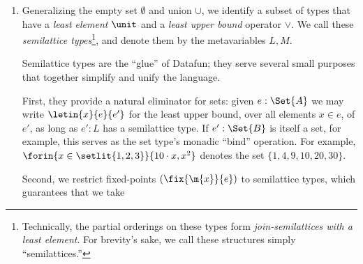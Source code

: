 \begin{enumerate}
\item\label{item:semilattice-types} Generalizing the empty set $\emptyset$ and
  union $\cup$, we identify a subset of types that have a \emph{least element}
  $\unit$ and a \emph{least upper bound} operator $\vee$. We call these
  \emph{semilattice types}\footnote{Technically, the partial orderings on these
    types form \emph{join-semilattices with a least element}. For brevity's
    sake, we call these structures simply ``semilattices.''}, and denote them by
  the metavariables $L,M$.

  Semilattice types are the ``glue'' of Datafun; they serve several small
  purposes that together simplify and unify the language.

  First, they provide a natural eliminator for sets: given $e : \Set{A}$ we may
  write $\letin{x}{e}{e'}$ for the least upper bound, over all elements $x \in
  e$, of $e'$, as long as $e' : L$ has a semilattice type. If $e' : \Set{B}$ is
  itself a set, for example, this serves as the set type's monadic ``bind''
  operation. For example, $\forin{x \in \setlit{1,2,3}} \{10 \cdot x, x^2\}$
  denotes the set $\{1, 4, 9, 10, 20, 30\}$.


  Second, we restrict fixed-points $(\fix{\m{x}}{e})$ to semilattice types,
  which guarantees that we take



\end{enumerate}
